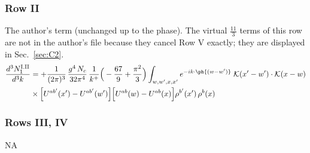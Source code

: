 \subsubsection*{Row II}
The author's term (unchanged up to the phase). The virtual $\frac{11}{3}$ terms of this row are not in the author's file because they cancel Row V exactly; they are displayed in Sec.~\ref{sec:C2}.
\begin{align}
\frac{d^{3}N^{\rm I.II}_{1}}{d^{3}k} & = +\frac{1}{(2\pi)^{3}}\,\frac{g^{4}\,N_{c}}{32\pi^{4}}\,\frac{1}{k^{+}}\Big(-\frac{67}{9}+\frac{\pi^{2}}{3}\Big)\int_{w,w',x,x'} e^{-ik\cdot\ph{(w-w')}}\;\mathcal{K}(x'-w')\cdot\mathcal{K}(x-w)\notag \\
& \times\Big[U^{ab'}(x')-U^{ab'}(w')\Big]\Big[U^{ab}(w)-U^{ab}(x)\Big]\rho^{b'}(x')\,\rho^{b}(x)\label{eq:B-I2a}
\end{align}
\subsubsection*{Rows III, IV} \textsc{NA}
